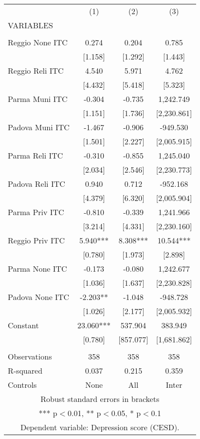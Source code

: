 \begin{tabular}{lccc} \hline
 & (1) & (2) & (3) \\
VARIABLES &  &  &  \\ \hline
 &  &  &  \\
Reggio None ITC & 0.274 & 0.204 & 0.785 \\
 & [1.158] & [1.292] & [1.443] \\
Reggio Reli ITC & 4.540 & 5.971 & 4.762 \\
 & [4.432] & [5.418] & [5.323] \\
Parma Muni ITC & -0.304 & -0.735 & 1,242.749 \\
 & [1.151] & [1.736] & [2,230.861] \\
Padova Muni ITC & -1.467 & -0.906 & -949.530 \\
 & [1.501] & [2.227] & [2,005.915] \\
Parma Reli ITC & -0.310 & -0.855 & 1,245.040 \\
 & [2.034] & [2.546] & [2,230.773] \\
Padova Reli ITC & 0.940 & 0.712 & -952.168 \\
 & [4.379] & [6.320] & [2,005.904] \\
Parma Priv ITC & -0.810 & -0.339 & 1,241.966 \\
 & [3.214] & [4.331] & [2,230.160] \\
Reggio Priv ITC & 5.940*** & 8.308*** & 10.544*** \\
 & [0.780] & [1.973] & [2.898] \\
Parma None ITC & -0.173 & -0.080 & 1,242.677 \\
 & [1.036] & [1.637] & [2,230.828] \\
Padova None ITC & -2.203** & -1.048 & -948.728 \\
 & [1.026] & [2.177] & [2,005.932] \\
Constant & 23.060*** & 537.904 & 383.949 \\
 & [0.780] & [857.077] & [1,681.862] \\
 &  &  &  \\
Observations & 358 & 358 & 358 \\
R-squared & 0.037 & 0.215 & 0.359 \\
 Controls & None & All & Inter \\ \hline
\multicolumn{4}{c}{ Robust standard errors in brackets} \\
\multicolumn{4}{c}{ *** p$<$0.01, ** p$<$0.05, * p$<$0.1} \\
\multicolumn{4}{c}{ Dependent variable: Depression score (CESD).} \\
\end{tabular}
